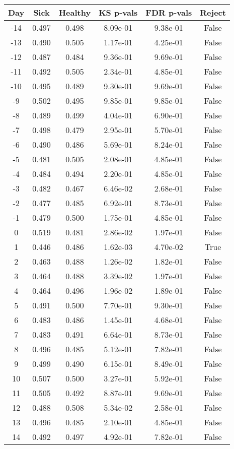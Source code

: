 \begin{tabular}{c|c|c|c|c|c}
Day &  Sick & Healthy &  KS p-vals & FDR p-vals & Reject\\
\hline
-14 & 0.497 &   0.498 &   8.09e-01 &   9.38e-01 &  False\\
-13 & 0.490 &   0.505 &   1.17e-01 &   4.25e-01 &  False\\
-12 & 0.487 &   0.484 &   9.36e-01 &   9.69e-01 &  False\\
-11 & 0.492 &   0.505 &   2.34e-01 &   4.85e-01 &  False\\
-10 & 0.495 &   0.489 &   9.30e-01 &   9.69e-01 &  False\\
 -9 & 0.502 &   0.495 &   9.85e-01 &   9.85e-01 &  False\\
 -8 & 0.489 &   0.499 &   4.04e-01 &   6.90e-01 &  False\\
 -7 & 0.498 &   0.479 &   2.95e-01 &   5.70e-01 &  False\\
 -6 & 0.490 &   0.486 &   5.69e-01 &   8.24e-01 &  False\\
 -5 & 0.481 &   0.505 &   2.08e-01 &   4.85e-01 &  False\\
 -4 & 0.484 &   0.494 &   2.20e-01 &   4.85e-01 &  False\\
 -3 & 0.482 &   0.467 &   6.46e-02 &   2.68e-01 &  False\\
 -2 & 0.477 &   0.485 &   6.92e-01 &   8.73e-01 &  False\\
 -1 & 0.479 &   0.500 &   1.75e-01 &   4.85e-01 &  False\\
  0 & 0.519 &   0.481 &   2.86e-02 &   1.97e-01 &  False\\
  1 & 0.446 &   0.486 &   1.62e-03 &   4.70e-02 &   True\\
  2 & 0.463 &   0.488 &   1.26e-02 &   1.82e-01 &  False\\
  3 & 0.464 &   0.488 &   3.39e-02 &   1.97e-01 &  False\\
  4 & 0.464 &   0.496 &   1.96e-02 &   1.89e-01 &  False\\
  5 & 0.491 &   0.500 &   7.70e-01 &   9.30e-01 &  False\\
  6 & 0.483 &   0.486 &   1.45e-01 &   4.68e-01 &  False\\
  7 & 0.483 &   0.491 &   6.64e-01 &   8.73e-01 &  False\\
  8 & 0.496 &   0.485 &   5.12e-01 &   7.82e-01 &  False\\
  9 & 0.499 &   0.490 &   6.15e-01 &   8.49e-01 &  False\\
 10 & 0.507 &   0.500 &   3.27e-01 &   5.92e-01 &  False\\
 11 & 0.505 &   0.492 &   8.87e-01 &   9.69e-01 &  False\\
 12 & 0.488 &   0.508 &   5.34e-02 &   2.58e-01 &  False\\
 13 & 0.496 &   0.485 &   2.10e-01 &   4.85e-01 &  False\\
 14 & 0.492 &   0.497 &   4.92e-01 &   7.82e-01 &  False\\
\end{tabular}